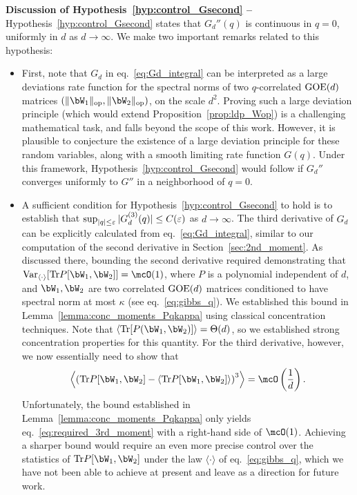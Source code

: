 \noindent
\textbf{Discussion of Hypothesis~\ref{hyp:control_Gsecond} --}
Hypothesis~\ref{hyp:control_Gsecond} states that $G_d''(q)$ is continuous in $q = 0$, uniformly in $d$ as $d \to \infty$.
We make two important remarks related to this hypothesis:
\begin{itemize}[leftmargin=*]
    \item First, note that $G_d$ in eq.~\eqref{eq:Gd_integral} can be interpreted as a large deviations rate function for the spectral norms of two $q$-correlated $\mathrm{GOE}(d)$ matrices $(\|\bW_1\|_\op, \|\bW_2\|_\op)$, 
    on the scale $d^2$. Proving such a large deviation principle (which would extend Proposition~\ref{prop:ldp_Wop}) is a challenging mathematical task, and falls beyond the scope of this work.
    However, it is plausible to conjecture the existence of a large deviation principle for these random variables, along with a smooth limiting rate function $G(q)$.
    Under this framework, Hypothesis~\ref{hyp:control_Gsecond} would follow if $G_d''$ converges uniformly to $G''$ in a neighborhood of $q = 0$.
    
    \item A sufficient condition for Hypothesis~\ref{hyp:control_Gsecond} to hold is to establish that $\sup_{|q| \leq \varepsilon} |G_d^{(3)}(q)| \leq C(\varepsilon)$ as $d \to \infty$.
    The third derivative of $G_d$ can be explicitly calculated from eq.~\eqref{eq:Gd_integral}, similar to our computation of the second derivative in Section~\ref{sec:2nd_moment}.
    As discussed there, bounding the second derivative required demonstrating that $\Var_{\langle \cdot \rangle}[\Tr P[\bW_1, \bW_2]] = \mcO(1)$, where $P$ is a polynomial independent of $d$, and $\bW_1, \bW_2$ are two correlated $\mathrm{GOE}(d)$ matrices conditioned to have spectral norm at most $\kappa$ (see eq.~\eqref{eq:gibbs_q}).
    We established this bound in Lemma~\ref{lemma:conc_moments_Pqkappa} using classical concentration techniques.
    Note that $\langle \Tr[P(\bW_1, \bW_2)]\rangle = \Theta(d)$, so we established strong concentration properties for this quantity.
    For the third derivative, however, we now essentially need to show that
    \begin{equation}\label{eq:required_3rd_moment}
        \left\langle\left(\Tr P[\bW_1, \bW_2] - \langle \Tr P[\bW_1, \bW_2] \rangle\right)^3\right\rangle = \mcO\left(\frac{1}{d}\right).
    \end{equation}
    Unfortunately, the bound established in Lemma~\ref{lemma:conc_moments_Pqkappa} only yields eq.~\eqref{eq:required_3rd_moment} 
    with a right-hand side of $\mcO(1)$.
    Achieving a sharper bound would require an even more precise control over the statistics of
    $\Tr P[\bW_1, \bW_2]$
    under the law $\langle \cdot \rangle$ of eq.~\eqref{eq:gibbs_q}, 
    which we have not been able to achieve at present and leave as a direction for future work.
\end{itemize}

